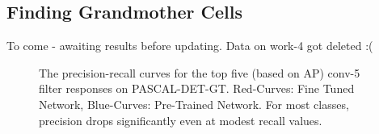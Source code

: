 \subsection{Finding Grandmother Cells}
\label{sub:class-specific-unit}
To come - awaiting results before updating. Data on work-4 got deleted :(


\begin{figure}[t!]
\centering
{}
\caption{The precision-recall curves for the top five (based on AP) conv-5 filter responses on PASCAL-DET-GT. Red-Curves: Fine Tuned Network, Blue-Curves: Pre-Trained Network. For most classes, precision drops significantly even at modest recall values. }
\label{fig:ap}
\end{figure}

